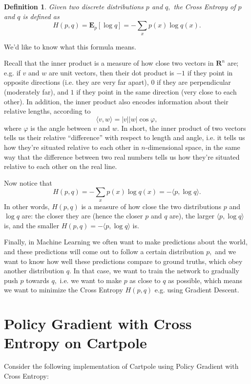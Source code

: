 \documentclass[20pt]{extarticle}
\theoremstyle{plain}
\newtheorem{definition}[theorem]{Definition}
\theoremstyle{definition}
\theoremstyle{remark}
\newcommand{\bE}{\mathbf E}
\newcommand{\bR}{\mathbf R}
\newcommand{\0}{\varnothing}
\newcommand{\f}{\varphi}
\newcommand{\<}{\langle}
\renewcommand{\>}{\rangle}
\begin{document}
\begin{definition}
Given two discrete distributions $ p $ and $ q, $ the Cross Entropy of $ p $ and $ q $ is defined as \[
H(p, q) = \bE_p[\log q] = - \sum_x p(x) \log q(x).
\]
\end{definition}

We'd like to know what this formula means.

Recall that the inner product is a measure of how close two vectors in $ \bR^n $ are; e.g. if $ v $ and $ w $ are unit vectors, then their dot product is $ -1 $ if they point in opposite directions (i.e. they are very far apart), $ 0 $ if they are perpendicular (moderately far), and $ 1 $ if they point in the same direction (very close to each other). In addition, the inner product also encodes information about their relative lengths, according to \[
\< v, w \> = | v | | w | \cos \f,
\]
where $ \f $ is the angle between $ v $ and $ w. $ In short, the inner product of two vectors tells us their relative ``difference'' with respect to length and angle, i.e. it tells us how they're situated relative to each other in $ n $-dimensional space, in the same way that the difference between two real numbers tells us how they're situated relative to each other on the real line.

Now notice that \[
H(p, q) = - \sum_x p(x) \log q(x) = - \< p, \log q \>.
\]
In other words, $ H(p, q) $ is a measure of how close the two distributions $ p $ and $ \log q $ are: the closer they are (hence the closer $ p $ and $ q $ are), the larger $ \< p, \log q \> $ is, and the smaller $ H(p, q) = - \< p, \log q \> $ is.

Finally, in Machine Learning we often want to make predictions about the world, and these predictions will come out to follow a certain distribution $ p, $ and we want to know how well these predictions compare to ground truths, which obey another distribution $ q. $ In that case, we want to train the network to gradually push $ p $ towards $ q, $ i.e. we want to make $ p $ as close to $ q $ as possible, which means we want to minimize the Cross Entropy $ H(p, q) $ e.g. using Gradient Descent.

\break
\section{Policy Gradient with Cross Entropy on Cartpole}

Consider the following implementation of Cartpole using Policy Gradient with Cross Entropy:
\end{document}
